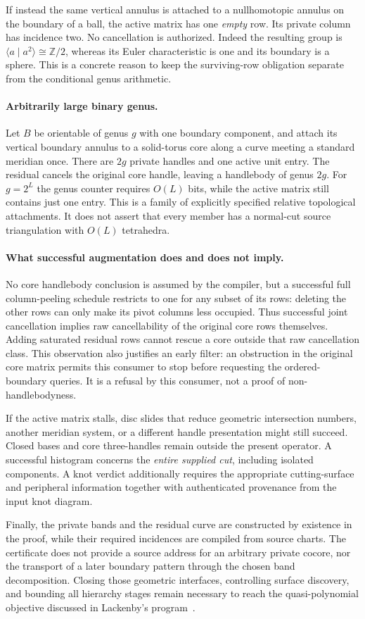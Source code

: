 If instead the same vertical annulus is attached to a
nullhomotopic annulus on the boundary of a ball, the active matrix
has one \emph{empty} row.  Its private column has incidence two.
No cancellation is authorized.  Indeed the resulting group is
$\langle a\mid a^2\rangle\cong\mathbb Z/2$, whereas its Euler
characteristic is one and its boundary is a sphere.  This is a
concrete reason to keep the surviving-row obligation separate
from the conditional genus arithmetic.

\paragraph{Arbitrarily large binary genus.}
Let $B$ be orientable of genus $g$ with one boundary component,
and attach its vertical boundary annulus to a solid-torus core
along a curve meeting a standard meridian once.  There are $2g$
private handles and one active unit entry.  The residual cancels
the original core handle, leaving a handlebody of genus $2g$.
For $g=2^L$ the genus counter requires $O(L)$ bits, while the
active matrix still contains just one entry.  This is a family
of explicitly specified relative topological attachments.  It
does not assert that every member has a normal-cut source
triangulation with $O(L)$ tetrahedra.

\paragraph{What successful augmentation does and does not imply.}
No core handlebody conclusion is assumed by the compiler, but a
successful full column-peeling schedule restricts to one for any
subset of its rows: deleting the other rows can only make its
pivot columns less occupied.  Thus successful joint cancellation
implies raw cancellability of the original core rows themselves.
Adding saturated residual rows cannot rescue a core outside that
raw cancellation class.  This observation also justifies an early
filter: an obstruction in the original core matrix permits this
consumer to stop before requesting the ordered-boundary queries.
It is a refusal by this consumer, not a proof of non-handlebodyness.

If the active matrix stalls, disc slides that reduce geometric
intersection numbers, another meridian system, or a different
handle presentation might still succeed.  Closed bases and core
three-handles remain outside the present operator.  A successful
histogram concerns the \emph{entire supplied cut}, including
isolated components.  A knot verdict additionally requires the
appropriate cutting-surface and peripheral information together
with authenticated provenance from the input knot diagram.

Finally, the private bands and the residual curve are constructed
by existence in the proof, while their required incidences are
compiled from source charts.  The certificate does not provide
a source address for an arbitrary private cocore, nor the
transport of a later boundary pattern through the chosen band
decomposition.  Closing those geometric interfaces, controlling
surface discovery, and bounding all hierarchy stages remain
necessary to reach the quasi-polynomial objective discussed in
Lackenby's program~\cite{lackenby2026}.
